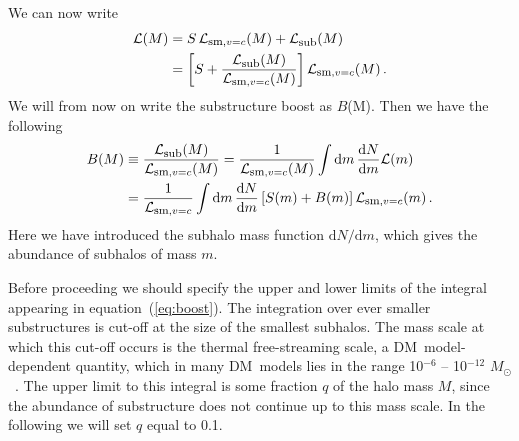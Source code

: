 \documentclass[aps,prd,twocolumn,amsmath,amssymb,floatfix,nofootinbib,10pt]{revtex4}
\newcommand{\DM}{DM}
\newcommand{\somm}{\ensuremath{S}}
\newcommand{\dd}{\mathrm{d}}
\newcommand{\eqnname}{equation}
\newcommand{\lum}{\ensuremath{\mathcal{L}}}
\newcommand{\lumsmoothc}{\ensuremath{\lum_{\mbox{{\footnotesize sm}},v=c}}}
\newcommand{\lumsub}{\ensuremath{\lum_{\mbox{{\footnotesize sub}}}}}
\newcommand{\boost}{\ensuremath{B}}
\newcommand{\Msol}{\ensuremath{M_{\odot}}}
\begin{document}
We can now write
\begin{equation}\label{eq:totboost}
\begin{split}
\lum(M) & = \somm\,\lumsmoothc(M) + \lumsub(M)\\
&= \left[ \somm + \frac{\lumsub(M)}{\lumsmoothc(M)}\right] \lumsmoothc(M)\, .
\end{split}
\end{equation}
We will from now on write the substructure boost as \boost(M). Then we
have the following
\begin{equation}\label{eq:boost}
\begin{split}
\boost(M) & \equiv \frac{\lumsub(M)}{\lumsmoothc(M)} = \frac{1}{\lumsmoothc(M)} \int \dd m \, \frac{\dd N}{\dd m} \lum(m)\\
&= \frac{1}{\lumsmoothc} \int \dd m\, \frac{\dd N}{\dd m} \left[ \somm(m) + \boost(m) \right] \lumsmoothc(m)\, .
\end{split}
\end{equation}
Here we have introduced the subhalo mass function $\dd N/\dd m$, which
gives the abundance of subhalos of mass $m$.

Before proceeding we should specify the upper and lower limits of the
integral appearing in \eqnname\ (\ref{eq:boost}). The integration over
ever smaller substructures is cut-off at the size of the smallest
subhalos. The mass scale at which this cut-off occurs is the thermal
free-streaming scale, a \DM\ model-dependent quantity, which in many
\DM\ models lies in the range 10$^{-6}$ -- 10$^{-12}$ \Msol\
\cite{1999PhRvD..59d3517S,2001PhRvD..64h3507H,2004MNRAS.353L..23G,2005PhRvD..71j3520L,2006PhRvL..97c1301P}. The
upper limit to this integral is some fraction $q$ of the halo mass
$M$, since the abundance of substructure does not continue up to this
mass scale. In the following we will set $q$ equal to 0.1.
\end{document}

